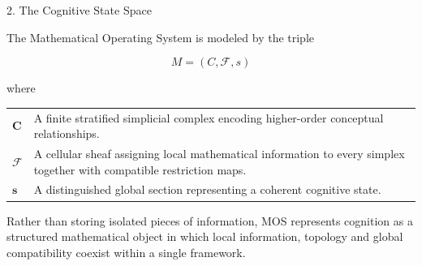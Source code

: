 %
%

\begin{mosbox}{2. The Cognitive State Space}

\BodyFont

The Mathematical Operating System is modeled by the triple

\[
\boxed{
M=(C,\mathcal{F},s)
}
\]

where

\begin{center}

\begin{tabular}{p{2.5cm}p{13.5cm}}

$\mathbf{C}$ &
A finite stratified simplicial complex encoding higher-order conceptual
relationships.

\\[3mm]

$\mathbf{\mathcal F}$ &
A cellular sheaf assigning local mathematical information to every simplex
together with compatible restriction maps.

\\[3mm]

$\mathbf{s}$ &
A distinguished global section representing a coherent cognitive state.

\end{tabular}

\end{center}

Rather than storing isolated pieces of information,
MOS represents cognition as a structured mathematical object in which
local information, topology and global compatibility coexist within a
single framework.

\end{mosbox}


\vspace{5mm}

\begin{center}
\end{center}


